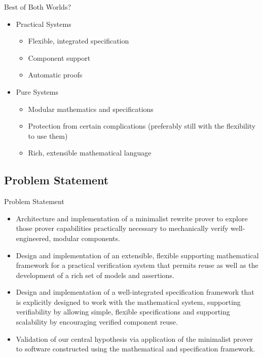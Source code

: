 \documentclass{beamer}
\begin{document}
\begin{frame}{Best of Both Worlds?}
	\begin{itemize}
		\item Practical Systems
		\begin{itemize}
			\item Flexible, integrated specification
			\item Component support
			\item Automatic proofs
		\end{itemize}
		\item Pure Systems
		\begin{itemize}
			\item Modular mathematics and specifications
			\item Protection from certain complications (preferably still with the flexibility to use them)
			\item Rich, extensible mathematical language
		\end{itemize}
	\end{itemize}
\end{frame}

\subsection{Problem Statement}
\begin{frame}{Problem Statement}
	\begin{itemize}
		\item Architecture and implementation of a minimalist rewrite prover to explore those prover capabilities practically necessary to mechanically verify well-engineered, modular components.
		\item Design and implementation of an extensible, flexible supporting mathematical framework for a practical verification system that permits reuse as well as the development of a rich set of models and assertions.
		\item Design and implementation of a well-integrated specification framework that is explicitly designed to work with the mathematical system, supporting verifiability by allowing simple, flexible specifications and supporting scalability by encouraging verified component reuse.
		\item Validation of our central hypothesis via application of the minimalist prover to software constructed using the mathematical and specification framework.
	\end{itemize}
\end{frame}
\end{document}
